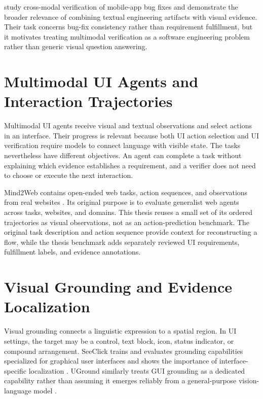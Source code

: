 \textcite{massenon2026} study cross-modal verification of mobile-app
bug fixes and demonstrate the broader relevance of combining textual
engineering artifacts with visual evidence. Their task concerns bug-fix
consistency rather than requirement fulfillment, but it motivates treating
multimodal verification as a software engineering problem rather than generic
visual question answering.

\section{Multimodal UI Agents and Interaction Trajectories}\label{multimodal-ui-agents-and-interaction-trajectories}

Multimodal UI agents receive visual and textual observations and select actions
in an interface. Their progress is relevant because both UI action selection and
UI verification require models to connect language with visible state. The
tasks nevertheless have different objectives. An agent can complete a task
without explaining which evidence establishes a requirement, and a verifier
does not need to choose or execute the next interaction.

Mind2Web contains open-ended web tasks, action sequences, and observations from
real websites \autocite{deng2023}. Its original purpose is to evaluate
generalist web agents across tasks, websites, and domains. This thesis reuses a
small set of its ordered trajectories as visual observations, not as an
action-prediction benchmark. The original task description and action sequence
provide context for reconstructing a flow, while the thesis benchmark adds
separately reviewed UI requirements, fulfillment labels, and evidence
annotations.

\section{Visual Grounding and Evidence Localization}\label{visual-grounding-and-evidence-localization}

Visual grounding connects a linguistic expression to a spatial region. In UI
settings, the target may be a control, text block, icon, status indicator, or
compound arrangement. SeeClick trains and evaluates grounding capabilities
specialized for graphical user interfaces and shows the importance of
interface-specific localization \autocite{cheng2024}. UGround similarly treats
GUI grounding as a dedicated capability rather than assuming it emerges
reliably from a general-purpose vision-language model \autocite{gou2025}.


